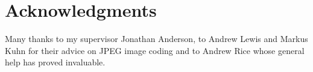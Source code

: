 
\bigskip

\begingroup
\let\clearpage\relax
\let\cleardoublepage\relax
\let\cleardoublepage\relax
\chapter*{Acknowledgments}

Many thanks to my supervisor Jonathan Anderson, to Andrew Lewis and Markus Kuhn for their advice on JPEG image coding and to Andrew Rice whose general help has proved invaluable.


\endgroup